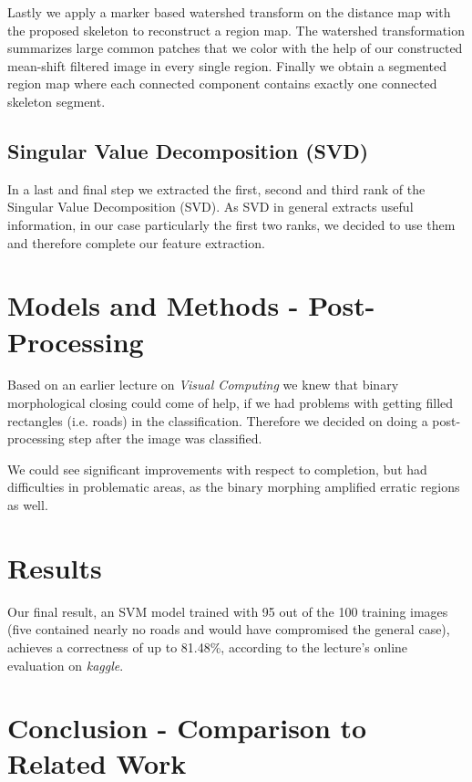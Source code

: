 \documentclass[10pt,conference,compsocconf]{IEEEtran}
\begin{document}
Lastly we apply a marker based watershed transform on the distance map with the proposed skeleton to reconstruct a region map. The watershed transformation summarizes large common patches that we color with the help of our constructed mean-shift filtered image in every single region. Finally we obtain a segmented region map where each connected component contains exactly one connected skeleton segment. 

\subsection{Singular Value Decomposition (SVD)}

In a last and final step we extracted the first, second and third rank of the Singular Value Decomposition (SVD). As SVD in general extracts useful information, in our case particularly the first two ranks, we decided to use them and therefore complete our feature extraction.

\section{Models and Methods - Post-Processing}

Based on an earlier lecture on \emph{Visual Computing} we knew that binary morphological closing could come of help, if we had problems with getting filled rectangles (i.e. roads) in the classification. Therefore we decided on doing a post-processing step after the image was classified.

We could see significant improvements with respect to completion, but had difficulties in problematic areas, as the binary morphing amplified erratic regions as well.

\section{Results}
\label{sec:results}

Our final result, an SVM model trained with 95 out of the 100 training images (five contained nearly no roads and would have compromised the general case), achieves a correctness of up to 81.48\%, according to the lecture's online evaluation on \emph{kaggle}.

\section{Conclusion - Comparison to Related Work}
\label{sec:comparison}
\end{document}
